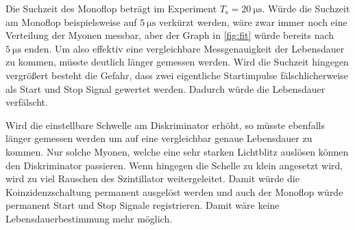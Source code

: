 Die Suchzeit des Monoflop beträgt im Experiment $T_\text{s}= \SI{20}{\micro\second}$.
Würde die Suchzeit am Monoflop beispielsweise auf $\SI{5}{\micro\second}$ verkürzt werden, 
wäre zwar immer noch eine Verteilung
der Myonen messbar, aber der Graph in \autoref{fig:fit} würde bereits nach $\SI{5}{\micro\second}$ enden.
Um also effektiv eine vergleichbare Messgenauigkeit der Lebensdauer zu kommen, müsste deutlich
länger gemessen werden.
Wird die Suchzeit hingegen vergrößert besteht die Gefahr, dass zwei eigentliche Startimpulse 
fälschlicherweise als Start und Stop Signal gewertet werden. 
Dadurch würde die Lebensdauer verfälscht.

Wird die einstellbare Schwelle am Diskriminator erhöht, so müsste ebenfalls länger gemessen werden um 
auf eine vergleichbar genaue Lebensdauer zu kommen.
Nur solche Myonen, welche eine sehr starken Lichtblitz auslösen können den Diskriminator passieren.
Wenn hingegen die Schelle zu klein angesetzt wird, wird zu viel Rauschen des Szintillator weitergeleitet.
Damit würde die Koinzidenzschaltung permanent ausgelöst werden und auch der Monoflop würde 
permanent Start und Stop Signale registrieren. 
Damit wäre keine Lebensdauerbestimmung mehr möglich.


\nocite{*}
\printbibliography{}

%
